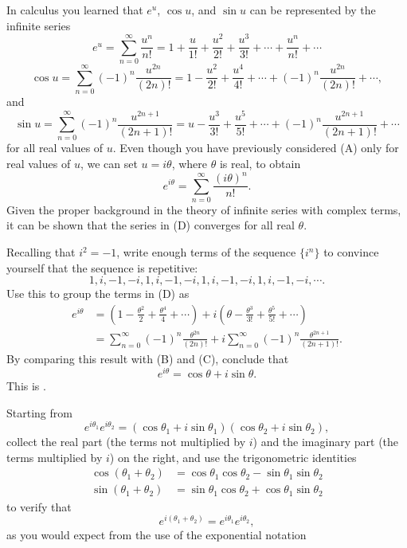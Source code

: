 \begin{exerciselist}
\item\label{exer:5.2.34}In calculus you learned that $e^u$, $\cos u$, and $\sin u$
can be represented by the infinite series
\[
e^u=\sum_{n=0}^\infty \frac{u^n}{n!}
=1+\frac{u}{1!}+\frac{u^2}{2!}+\frac{u^3}{3!}+\cdots+\frac{u^n}{n!}+\cdots
\tag{A}
\]
\[
\cos u=\sum_{n=0}^\infty (-1)^n\frac{u^{2n}}{(2n)!}
=1-\frac{u^2}{2!}+\frac{u^4}{4!}+\cdots+(-1)^n\frac{u^{2n}}{(2n)!}
+\cdots,
\tag{B}
\]
and
\[
\sin u=\sum_{n=0}^\infty (-1)^n\frac{u^{2n+1}}{(2n+1)!}
=u-\frac{u^3}{3!}+\frac{u^5}{5!}+\cdots+(-1)^n
\frac{u^{2n+1}}{(2n+1)!}
+\cdots
\tag{C}
\]
for all real values of $u$.
Even though you have previously considered (A)
only for real values of $u$, we can set $u=i\theta$, where $\theta$ is
real, to obtain
\[
e^{i\theta}=\sum_{n=0}^\infty\frac{(i\theta)^n}{n!}.
\tag{D}
\]
Given the proper background in the theory of infinite series with
complex terms, it can be shown that the series in
(D) converges for all real $\theta$.
\begin{alist}
\item %
Recalling that $i^2=-1$,
write enough  terms of the sequence $\{i^n\}$ to convince yourself
that the sequence is repetitive:
\[
1,i,-1,-i,1,i,-1,-i,1,i,-1,-i,1,i,-1,-i,\cdots.
\]
Use this to group the terms in (D) as
\begin{align*}
e^{i\theta}
&=\left(1-\frac{\theta^2}{2}+\frac{\theta^4}{4}+\cdots\right)
+i\left(\theta-\frac{\theta^3}{3!}+\frac{\theta^5}{5!}+\cdots\right)\\
&=\sum_{n=0}^\infty (-1)^n\frac{\theta^{2n}}{(2n)!}
+i\sum_{n=0}^\infty (-1)^n\frac{\theta^{2n+1}}{(2n+1)!}.
\end{align*}
By comparing this result with (B) and
(C), conclude that
\[
e^{i\theta}=\cos\theta+i\sin\theta.
\tag{E}
\]
This is
.
\item %
Starting from
\[
e^{i\theta_1}e^{i\theta_2}=(\cos\theta_1+i\sin\theta_1)
(\cos\theta_2+i\sin\theta_2),
\]
collect the real part (the terms not multiplied by $i$)
and the imaginary part (the terms  multiplied by $i$) on the
right, and use the trigonometric identities
\begin{align*}
\cos(\theta_1+\theta_2)&=\cos\theta_1\cos\theta_2-\sin\theta_1\sin\theta_2\\
\sin(\theta_1+\theta_2)&=\sin\theta_1\cos\theta_2+\cos\theta_1\sin\theta_2
\end{align*}
to verify that
\[
e^{i(\theta_1+\theta_2)}=e^{i\theta_1}e^{i\theta_2},
\]
as you would expect from the use of the exponential notation

\end{alist}
\end{exerciselist}

